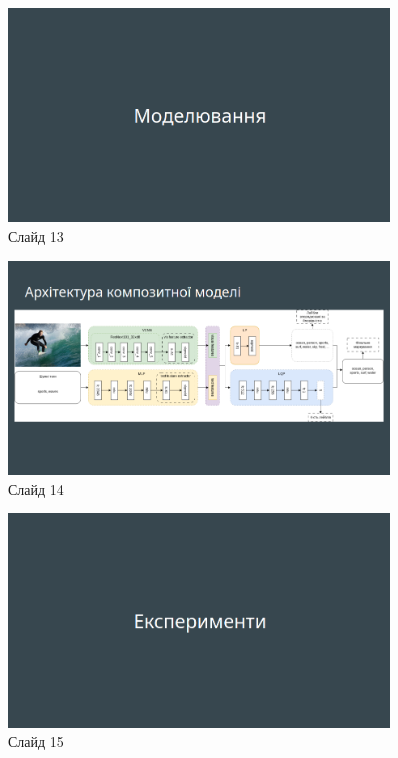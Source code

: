 \documentclass{udstu}
\begin{document}
\begin{figure}[!ht]
	\centering
	\includegraphics[width=0.9\textwidth]{PNG/present/present-13}
	\caption{Слайд 13}
\end{figure}

\begin{figure}[!ht]
	\centering
	\includegraphics[width=0.9\textwidth]{PNG/present/present-14}
	\caption{Слайд 14}
\end{figure}

\begin{figure}[!ht]
	\centering
	\includegraphics[width=0.9\textwidth]{PNG/present/present-15}
	\caption{Слайд 15}
\end{figure}
\end{document}
